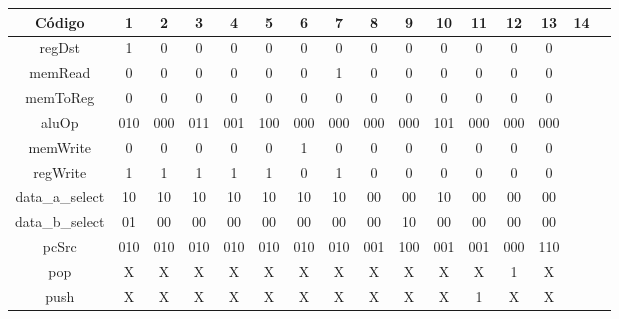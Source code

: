 	\begin{center}
		\begin{longtable}[pos]{| c | c | c | c | c | c | c | c | c | c | c | c | c | c | c | c |} \hline
			\multicolumn{1}{|c|}{\cellcolor[gray]{0.9}\textbf{\small Código}} & 
			\multicolumn{1}{c|}{\cellcolor[gray]{0.9}\textbf{1}} & 
			\multicolumn{1}{c|}{\cellcolor[gray]{0.9}\textbf{2}} &
			\multicolumn{1}{c|}{\cellcolor[gray]{0.9}\textbf{3}} &
            \multicolumn{1}{c|}{\cellcolor[gray]{0.9}\textbf{4}} &
            \multicolumn{1}{c|}{\cellcolor[gray]{0.9}\textbf{5}} &
            \multicolumn{1}{c|}{\cellcolor[gray]{0.9}\textbf{6}} &
            \multicolumn{1}{c|}{\cellcolor[gray]{0.9}\textbf{7}} &
            \multicolumn{1}{c|}{\cellcolor[gray]{0.9}\textbf{8}} &
            \multicolumn{1}{c|}{\cellcolor[gray]{0.9}\textbf{9}} &
            \multicolumn{1}{c|}{\cellcolor[gray]{0.9}\textbf{10}} &
			\multicolumn{1}{c|}{\cellcolor[gray]{0.9}\textbf{11}} &
			\multicolumn{1}{c|}{\cellcolor[gray]{0.9}\textbf{12}} &
            \multicolumn{1}{c|}{\cellcolor[gray]{0.9}\textbf{13}} &
            \multicolumn{1}{c|}{\cellcolor[gray]{0.9}\textbf{14}} \\ \hline
			\endhead
			\hline
			\endlastfoot
			
			\small regDst 			& 1   & 0   & 0   & 0   & 0   & 0   & 0   & 0   & 0   & 0   & 0   & 0   & 0  &  \\ \hline
            \small memRead 			& 0   & 0   & 0   & 0   & 0   & 0   & 1   & 0   & 0   & 0   & 0   & 0   & 0  &  \\ \hline
            \small memToReg 		& 0   & 0   & 0   & 0   & 0   & 0   & 0   & 0   & 0   & 0   & 0   & 0   & 0  &  \\ \hline
            \small aluOp 			& \small 010 & \small 000 & \small 011 & \small 001 & \small 100 & \small 000 & \small 000 & \small 000 & \small 000 & \small 101 & \small 000 & \small 000 & \small 000 & \\ \hline
            \small memWrite 		& 0   & 0   & 0   & 0   & 0   & 1   & 0   & 0   & 0   & 0   & 0   & 0   & 0  &  \\ \hline
            \small regWrite 		& 1   & 1   & 1   & 1   & 1   & 0   & 1   & 0   & 0   & 0   & 0   & 0   & 0  &  \\ \hline
            \small data\_a\_select 		& 10  & 10  & 10  & 10  & 10  & 10  & 10  & 00  & 00  & 10  & 00  & 00  & 00 & \\ \hline
            \small data\_b\_select 		& 01  & 00  & 00  & 00  & 00  & 00  & 00  & 00  & 10  & 00  & 00  & 00  & 00 & \\ \hline
            \small pcSrc 			& \small 010 & \small 010   & \small 010 & \small 010 & \small 010 & \small 010 & \small 010 & \small 001 & \small 100 & \small 001 & \small 001 & \small 000 & \small 110 & \\ \hline
            \small pop 				& X   & X   & X   & X   & X   & X   & X   & X   & X   & X   & X   & 1   & X  &  \\ \hline
            \small push 			& X   & X   & X   & X   & X   & X   & X   & X   & X   & X   & 1   & X   & X  &  \\ \hline


\end{longtable}
\end{center}
